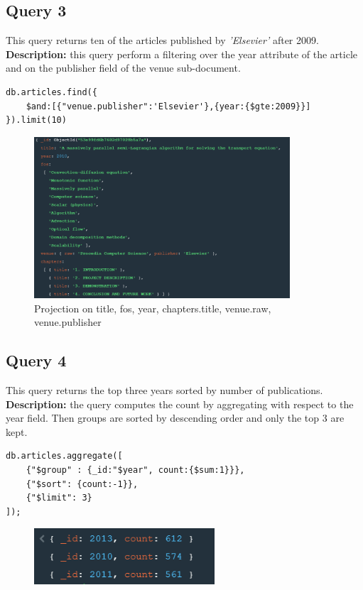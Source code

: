 \documentclass{Configuration_Files/PoliMi3i_thesis}
\begin{document}
\subsection{Query 3}
This query returns ten of the articles published by \emph{'Elsevier'} after 2009.\newline
\textbf{Description:} this query perform a filtering over the year attribute of the article and on the publisher
field of the venue sub-document.
\begin{lstlisting}
db.articles.find({
	$and:[{"venue.publisher":'Elsevier'},{year:{$gte:2009}}]
}).limit(10)
\end{lstlisting}
\begin{figure}[H]
\centering
\includegraphics[width=0.85\textwidth]{query/mongo_q3.PNG}
\caption{Projection on title, fos, year, chapters.title, venue.raw, venue.publisher}
\label{fig:query3}
\end{figure}

\subsection{Query 4}
This query returns the top three years sorted by number of publications.\newline
\textbf{Description:} the query computes the count by aggregating with respect to the year field. Then groups
are sorted by descending order and only the top 3 are kept.
\begin{lstlisting}
db.articles.aggregate([
	{"$group" : {_id:"$year", count:{$sum:1}}},
	{"$sort": {count:-1}},
	{"$limit": 3}
]);
\end{lstlisting}
\begin{figure}[H]
\centering
\includegraphics[width=0.6\textwidth]{query/mongo_q4.PNG}
\label{fig:query4}
\end{figure}
\end{document}
